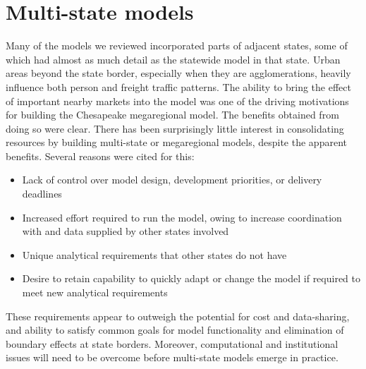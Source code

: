 \section{Multi-state models}

Many of the models we reviewed incorporated parts of adjacent states, some of which had almost as much detail as the statewide model in that state. Urban areas beyond the state border, especially when they are agglomerations, heavily influence both person and freight traffic patterns. The ability to bring the effect of important nearby markets into the model was one of the driving motivations for building the Chesapeake megaregional model. The benefits obtained from doing so were clear. There has been surprisingly little interest in consolidating resources by building multi-state or megaregional models, despite the apparent benefits. Several reasons were cited for this:

\begin{itemize}
\item Lack of control over model design, development priorities, or delivery deadlines
\item Increased effort required to run the model, owing to increase coordination with and data supplied by other states involved
\item Unique analytical requirements that other states do not have
\item Desire to retain capability to quickly adapt or change the model if required to meet new analytical requirements
\end{itemize}

These requirements appear to outweigh the potential for cost and data-sharing, and ability to satisfy common goals for model functionality and elimination of boundary effects at state borders. Moreover, computational and institutional issues will need to be overcome before multi-state models emerge in practice.
